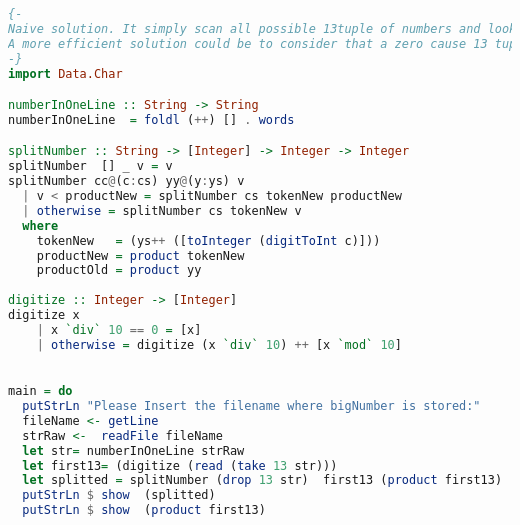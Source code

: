 \begin{solution}

		\begin{lstlisting}[language=Haskell, caption="Haskell"]
{-
Naive solution. It simply scan all possible 13tuple of numbers and look for maximum (product of digits)
A more efficient solution could be to consider that a zero cause 13 tuple to have 0 product!
-}
import Data.Char

numberInOneLine :: String -> String
numberInOneLine  = foldl (++) [] . words

splitNumber :: String -> [Integer] -> Integer -> Integer
splitNumber  [] _ v = v 
splitNumber cc@(c:cs) yy@(y:ys) v 
  | v < productNew = splitNumber cs tokenNew productNew 
  | otherwise = splitNumber cs tokenNew v                          
  where
    tokenNew   = (ys++ ([toInteger (digitToInt c)]))
    productNew = product tokenNew 
    productOld = product yy
              
digitize :: Integer -> [Integer]
digitize x
	| x `div` 10 == 0 = [x]
	| otherwise = digitize (x `div` 10) ++ [x `mod` 10]
	

main = do 
  putStrLn "Please Insert the filename where bigNumber is stored:"
  fileName <- getLine
  strRaw <-  readFile fileName 
  let str= numberInOneLine strRaw
  let first13= (digitize (read (take 13 str)))
  let splitted = splitNumber (drop 13 str)  first13 (product first13) 
  putStrLn $ show  (splitted)
  putStrLn $ show  (product first13)        

		\end{lstlisting}  

\end{solution}	





